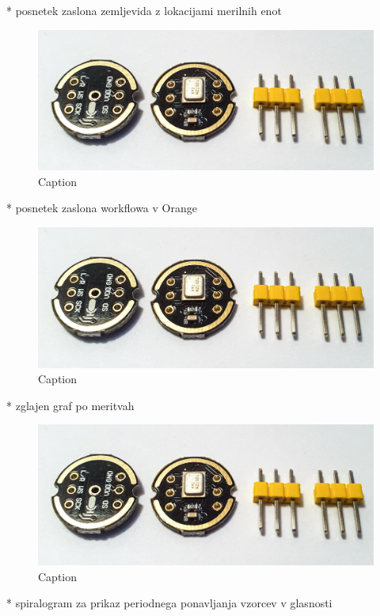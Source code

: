 \documentclass[a4paper, 12pt]{book}
\begin{document}
* posnetek zaslona zemljevida z lokacijami merilnih enot
\begin{figure}[H]
    \centering
    \includegraphics[width=\linewidth]{slikovno_gradivo/INMP441_1.jpg}
    \caption{Caption}
    \label{fig:INMP441}
\end{figure}
* posnetek zaslona workflowa v Orange
\begin{figure}[H]
    \centering
    \includegraphics[width=\linewidth]{slikovno_gradivo/INMP441_1.jpg}
    \caption{Caption}
    \label{fig:INMP441}
\end{figure}
* zglajen graf po meritvah
\begin{figure}[H]
    \centering
    \includegraphics[width=\linewidth]{slikovno_gradivo/INMP441_1.jpg}
    \caption{Caption}
    \label{fig:INMP441}
\end{figure}
* spiralogram za prikaz periodnega ponavljanja vzorcev v glasnosti
\end{document}
